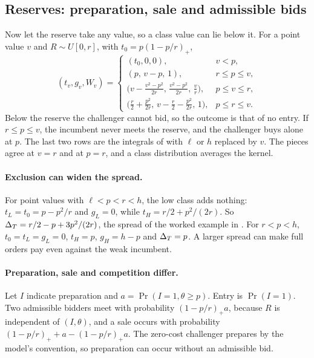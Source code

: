 \subsection{Reserves: preparation, sale and admissible bids}\label{sec:11_welfare-reserves}

Now let the reserve take any value, so a class value can lie below it. For a point value \(v\) and
\(R\sim U[0,r]\), with \(t_0=p(1-p/r)_+\),
\[
(t_v,g_v,W_v)=\begin{cases}
(t_0,0,0),&v<p,\\
(p,\,v-p,\,1),&r\le p\le v,\\
\bigl(v-\tfrac{v^2-p^2}{2r},\,\tfrac{v^2-p^2}{2r},\,\tfrac vr\bigr),&p\le v\le r,\\[3pt]
\bigl(\tfrac r2+\tfrac{p^2}{2r},\,v-\tfrac r2-\tfrac{p^2}{2r},\,1\bigr),&p\le r\le v.
\end{cases}
\]
Below the reserve the challenger cannot bid, so the outcome is that of no entry. If \(r\le p\le v\), the incumbent
never meets the reserve, and the challenger buys alone at \(p\). The last two rows are the integrals of
 with \(\ell\) or \(h\) replaced by \(v\). The pieces agree at \(v=r\) and at \(p=r\), and a
class distribution averages the kernel.

\paragraph{Exclusion can widen the spread.} For point values with \(\ell<p<r<h\), the low class adds nothing:
\(t_L=t_0=p-p^2/r\) and \(g_L=0\), while \(t_H=r/2+p^2/(2r)\). So \(\Delta_T=r/2-p+3p^2/(2r)\), the spread of the worked
example in . For \(r<p<h\), \(t_0=t_L=g_L=0\), \(t_H=p\), \(g_H=h-p\) and \(\Delta_T=p\). A larger
spread can make full orders pay even against the weak incumbent.

\paragraph{Preparation, sale and competition differ.} Let \(I\) indicate preparation and \(a=\Pr(I=1,\theta\ge p)\).
Entry is \(\Pr(I=1)\). Two admissible bidders meet with probability \((1-p/r)_+a\), because \(R\) is independent of
\((I,\theta)\), and a sale occurs with probability \((1-p/r)_++a-(1-p/r)_+a\). The zero-cost challenger prepares by the
model's convention, so preparation can occur without an admissible bid.

